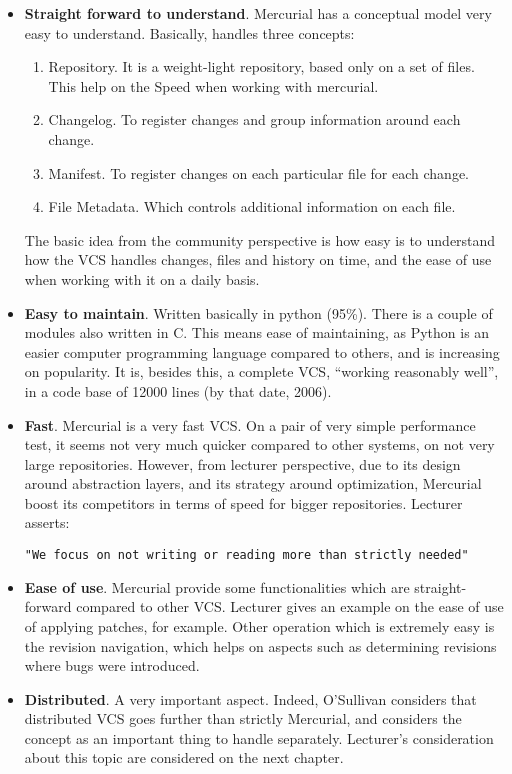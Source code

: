 \documentclass[11pt]{article}
\begin{document}
\begin{itemize}
\item{\textbf{Straight forward to understand}}. Mercurial has a conceptual model very easy to understand. Basically, handles three concepts:
\begin{enumerate}\itemsep0pt
\item{Repository}. It is a weight-light repository, based only on a set of files. This help on the Speed when working with mercurial.
\item{Changelog}. To register changes and group information around each change.
\item{Manifest}. To register changes on each particular file for each change.
\item{File Metadata}. Which controls additional information on each file.
\end{enumerate}
The basic idea from the community perspective is how easy is to understand how the VCS handles changes, files and history on time, and the ease of use when working with it on a daily basis.
\item{\textbf{Easy to maintain}}. Written basically in python (95\%). There is a couple of modules also written in C. This means ease of maintaining, as Python is an easier computer programming language compared to others, and is increasing on popularity. It is, besides this, a complete VCS, ``working reasonably well'', in a code base of 12000 lines (by that date, 2006).
\item{\textbf{Fast}}. Mercurial is a very fast VCS. On a pair of very simple performance test, it seems not very much quicker compared to other systems, on not very large repositories. However, from lecturer perspective, due to its design around abstraction layers, and its strategy around optimization, Mercurial boost its competitors in terms of speed for bigger repositories. Lecturer asserts:
\begin{verbatim}
"We focus on not writing or reading more than strictly needed"
\end{verbatim}
\item{\textbf{Ease of use}}. Mercurial provide some functionalities which are straight-forward compared to other VCS. Lecturer gives an example on the ease of use of applying patches, for example. Other operation which is extremely easy is the revision navigation, which helps on aspects such as determining revisions where bugs were introduced.
\item{\textbf{Distributed}}. A very important aspect. Indeed, O'Sullivan considers that distributed VCS goes further than strictly Mercurial, and considers the concept as an important thing to handle separately. Lecturer's consideration about this topic are considered on the next chapter.
\end{itemize}
\end{document}
